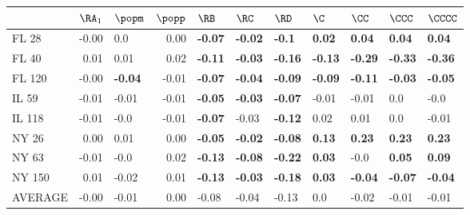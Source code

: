 \begin{tabular}{lrlrlllllll}
\toprule
{} &  $\RA_1$ &         $\popm$ &  $\popp$ &           $\RB$ &           $\RC$ &           $\RD$ &            $\C$ &           $\CC$ &          $\CCC$ &         $\CCCC$ \\
\midrule
FL 28   &    -0.00 &             0.0 &     0.00 &  \textbf{-0.07} &  \textbf{-0.02} &   \textbf{-0.1} &   \textbf{0.02} &   \textbf{0.04} &   \textbf{0.04} &   \textbf{0.04} \\
FL 40   &     0.01 &            0.01 &     0.02 &  \textbf{-0.11} &  \textbf{-0.03} &  \textbf{-0.16} &  \textbf{-0.13} &  \textbf{-0.29} &  \textbf{-0.33} &  \textbf{-0.36} \\
FL 120  &    -0.00 &  \textbf{-0.04} &    -0.01 &  \textbf{-0.07} &  \textbf{-0.04} &  \textbf{-0.09} &  \textbf{-0.09} &  \textbf{-0.11} &  \textbf{-0.03} &  \textbf{-0.05} \\
IL 59   &    -0.01 &           -0.01 &    -0.01 &  \textbf{-0.05} &  \textbf{-0.03} &  \textbf{-0.07} &           -0.01 &           -0.01 &             0.0 &            -0.0 \\
IL 118  &    -0.01 &            -0.0 &    -0.01 &  \textbf{-0.07} &           -0.03 &  \textbf{-0.12} &            0.02 &            0.01 &             0.0 &           -0.01 \\
NY 26   &     0.00 &            0.01 &     0.00 &  \textbf{-0.05} &  \textbf{-0.02} &  \textbf{-0.08} &   \textbf{0.13} &   \textbf{0.23} &   \textbf{0.23} &   \textbf{0.23} \\
NY 63   &    -0.01 &            -0.0 &     0.02 &  \textbf{-0.13} &  \textbf{-0.08} &  \textbf{-0.22} &   \textbf{0.03} &            -0.0 &   \textbf{0.05} &   \textbf{0.09} \\
NY 150  &     0.01 &           -0.02 &     0.01 &  \textbf{-0.13} &  \textbf{-0.03} &  \textbf{-0.18} &   \textbf{0.03} &  \textbf{-0.04} &  \textbf{-0.07} &  \textbf{-0.04} \\
AVERAGE &    -0.00 &           -0.01 &     0.00 &           -0.08 &           -0.04 &           -0.13 &             0.0 &           -0.02 &           -0.01 &           -0.01 \\
\bottomrule
\end{tabular}
